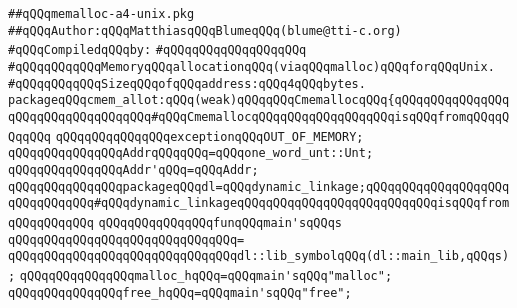 \label{src/lib/c-glue-lib/ram/memalloc-a4-unix.pkg}
\verb|##qQQqmemalloc-a4-unix.pkg|\newline
\verb|##qQQqAuthor:qQQqMatthiasqQQqBlumeqQQq(blume@tti-c.org)|\newline
\newline
\verb|#qQQqCompiledqQQqby:|\newline
\verb|#qQQqqQQqqQQqqQQqqQQq|\newline
\newline
\verb|#qQQqqQQqqQQqMemoryqQQqallocationqQQq(viaqQQqmalloc)qQQqforqQQqUnix.|\newline
\verb|#qQQqqQQqqQQqSizeqQQqofqQQqaddress:qQQq4qQQqbytes.|\newline
\newline
\newline
\verb|packageqQQqcmem_allot:qQQq(weak)qQQqqQQqCmemallocqQQq{qQQqqQQqqQQqqQQqqQQqqQQqqQQqqQQqqQQq#qQQqCmemallocqQQqqQQqqQQqqQQqqQQqisqQQqfromqQQqqQQqqQQq|\newline
\newline
\verb|qQQqqQQqqQQqqQQqexceptionqQQqOUT_OF_MEMORY;|\newline
\newline
\verb|qQQqqQQqqQQqqQQqAddrqQQqqQQq=qQQqone_word_unt::Unt;|\newline
\verb|qQQqqQQqqQQqqQQqAddr'qQQq=qQQqAddr;|\newline
\newline
\verb|qQQqqQQqqQQqqQQqpackageqQQqdl=qQQqdynamic_linkage;qQQqqQQqqQQqqQQqqQQqqQQqqQQqqQQq#qQQqdynamic_linkageqQQqqQQqqQQqqQQqqQQqqQQqqQQqisqQQqfromqQQqqQQqqQQq|\newline
\newline
\verb|qQQqqQQqqQQqqQQqfunqQQqmain'sqQQqs|\newline
\verb|qQQqqQQqqQQqqQQqqQQqqQQqqQQqqQQq=|\newline
\verb|qQQqqQQqqQQqqQQqqQQqqQQqqQQqqQQqdl::lib_symbolqQQq(dl::main_lib,qQQqs);|\newline
\newline
\verb|qQQqqQQqqQQqqQQqmalloc_hqQQq=qQQqmain'sqQQq"malloc";|\newline
\newline
\verb|qQQqqQQqqQQqqQQqfree_hqQQq=qQQqmain'sqQQq"free";|\newline
